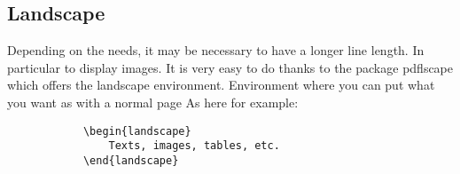 \begin{landscape}
    \subsection{Landscape}
    Depending on the needs, it may be necessary to have a longer line length. In particular to
    display images.
    It is very easy to do thanks to the package pdflscape which offers the landscape environment.
    Environment where you can put what you want as with a normal page
    As here for example:
    \begin{code}
        \begin{verbatim}
            \begin{landscape}
                Texts, images, tables, etc.
            \end{landscape}
    \end{verbatim}
        \caption{Use of landscape}
    \end{code}
\end{landscape}
